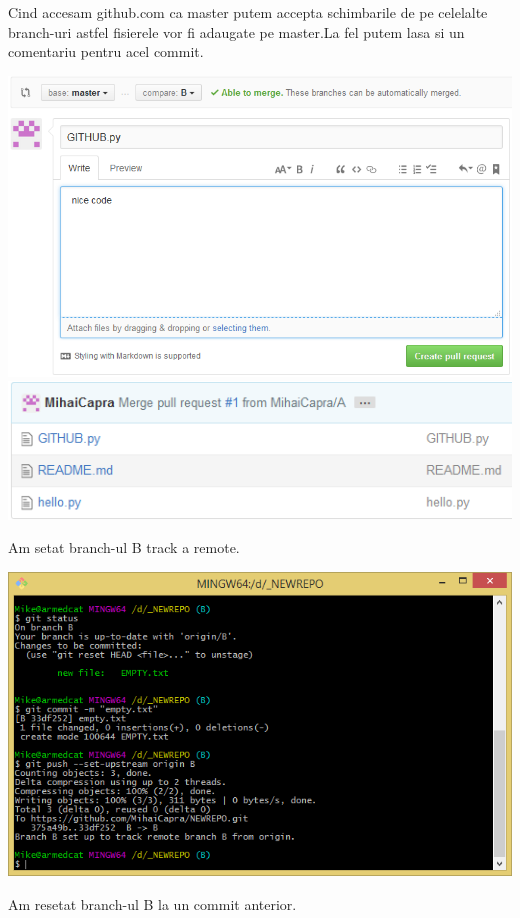 Cind accesam github.com ca master putem accepta schimbarile de pe celelalte branch-uri astfel fisierele vor fi adaugate pe master.La fel putem lasa si un comentariu pentru acel commit.
\begin{center}
\includegraphics[scale=0.7]{images/accept}\\
\includegraphics[scale=0.7]{images/accept_request}\\
\end{center}
Am setat branch-ul B track a remote.
\begin{center}
\includegraphics[scale=0.7]{images/track_remote}
\end{center}
Am resetat branch-ul B la un commit anterior.
